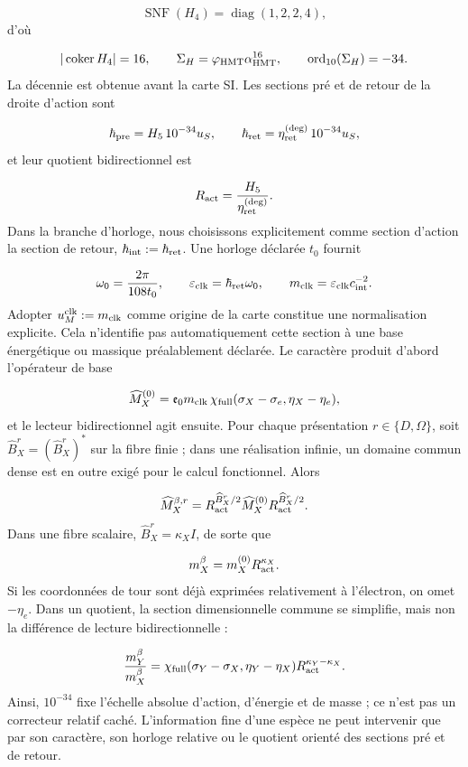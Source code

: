 \[
\operatorname{SNF}(H_4)=\operatorname{diag}(1,2,2,4),
\]
d'où

\[
|\operatorname{coker}H_4|=16,
\qquad
\Sigma_H=\varphi_{\rm HMT}\alpha_{\rm HMT}^{16},
\qquad
\operatorname{ord}_{10}(\Sigma_H)=-34.
\]
La décennie est obtenue avant la carte SI. Les sections pré et de retour de la droite d'action sont

\[
\hbar_{\rm pre}=H_5\,10^{-34}u_S,
\qquad
\hbar_{\rm ret}=\eta_{\rm ret}^{(\deg)}\,10^{-34}u_S,
\]
et leur quotient bidirectionnel est

\[
R_{\rm act}=\frac{H_5}{\eta_{\rm ret}^{(\deg)}}.
\]
Dans la branche d'horloge, nous choisissons explicitement comme section d'action la section de retour, \(\hbar_{\rm int}:=\hbar_{\rm ret}\). Une horloge déclarée \(t_0\) fournit

\[
\omega_0=\frac{2\pi}{108t_0},
\qquad
\varepsilon_{\rm clk}=\hbar_{\rm ret}\omega_0,
\qquad
m_{\rm clk}=\varepsilon_{\rm clk}c_{\rm int}^{-2}.
\]
Adopter \(u_M^{\rm clk}:=m_{\rm clk}\) comme origine de la carte constitue une normalisation explicite. Cela n'identifie pas automatiquement cette section à une base énergétique ou massique préalablement déclarée. Le caractère produit d'abord l'opérateur de base

\[
\widehat M_X^{(0)}
=\mathfrak e_0m_{\rm clk}\,
\chi_{\rm full}(\sigma_X-\sigma_e,\eta_X-\eta_e),
\]
et le lecteur bidirectionnel agit ensuite. Pour chaque présentation \(r\in\{D,\Omega\}\), soit \(\widehat B_X^r=(\widehat B_X^r)^*\) sur la fibre finie ; dans une réalisation infinie, un domaine commun dense est en outre exigé pour le calcul fonctionnel. Alors

\[
\widehat M_X^{\beta,r}
=R_{\rm act}^{\widehat B_X^r/2}
\widehat M_X^{(0)}
R_{\rm act}^{\widehat B_X^r/2}.
\]
Dans une fibre scalaire, \(\widehat B_X^r=\kappa_XI\), de sorte que

\[
m_X^\beta=m_X^{(0)}R_{\rm act}^{\kappa_X}.
\]
Si les coordonnées de tour sont déjà exprimées relativement à l'électron, on omet \(-\eta_e\). Dans un quotient, la section dimensionnelle commune se simplifie, mais non la différence de lecture bidirectionnelle :

\[
\frac{m_Y^\beta}{m_X^\beta}
=\chi_{\rm full}(\sigma_Y-\sigma_X,\eta_Y-\eta_X)
R_{\rm act}^{\kappa_Y-\kappa_X}.
\]
Ainsi, \(10^{-34}\) fixe l'échelle absolue d'action, d'énergie et de masse ; ce n'est pas un correcteur relatif caché. L'information fine d'une espèce ne peut intervenir que par son caractère, son horloge relative ou le quotient orienté des sections pré et de retour.

